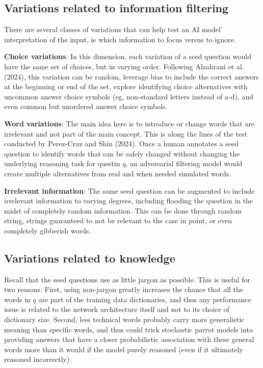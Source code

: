 \documentclass[
]{article}
\begin{document}
\subsection{Variations related to information
filtering}\label{variations-related-to-information-filtering}

There are several classes of variations that can help test an AI model'
interpretation of the input, ie which information to focus versus to
ignore.

\textbf{Choice variations}: In this dimension, each variation of a seed
question would have the same set of choices, but in varying order.
Following Alzahrani et al. (2024), this variation can be random,
leverage bias to include the correct answers at the beginning or end of
the set, explore identifying choice alternatives with uncommon answer
choice symbols (eg, non-standard letters instead of a-d), and even
common but unordered answer choice symbols.

\textbf{Word variations}: The main idea here is to introduce or change
words that are irrelevant and not part of the main concept. This is
along the lines of the test conducted by Perez-Cruz and Shin (2024).
Once a human annotates a seed question to identify words that can be
safely changed without changing the underlying reasoning task for
questin \(q\), an adversarial filtering model would create multiple
alternatives from real and when needed simulated words.

\textbf{Irrelevant information}: The same seed question can be augmented
to include irrelevant information to varying degrees, including flooding
the question in the midst of completely random information. This can be
done through random string, strings guaranteed to not be relevant to the
case in point, or even completely gibberish words.

\subsection{Variations related to
knowledge}\label{variations-related-to-knowledge}

Recall that the seed questions use as little jargon as possible. This is
useful for two reasons. First, using non-jargon greatly increases the
chance that all the words in \(q\) are part of the training data
dictionaries, and thus any performance issue is related to the network
architecture itself and not to its choice of dictionary size. Second,
less technical words probably carry more generalistic meaning than
specific words, and thus could trick stochastic parrot models into
providing answers that have a closer probabilistic association with
these general words more than it would if the model purely reasoned
(even if it ultimately reasoned incorrectly).
\end{document}
